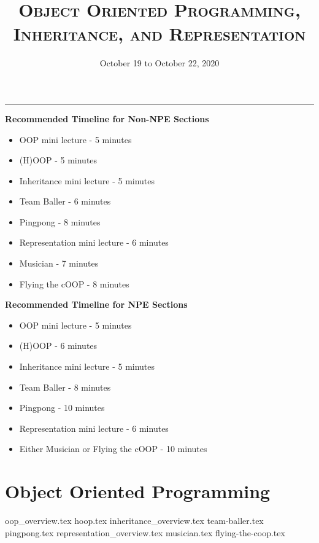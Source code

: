\documentclass{exam}
\title{\textsc{Object Oriented Programming, Inheritance, and Representation}}
\date{October 19 to October 22, 2020}
\begin{document}
\maketitle
\rule{\textwidth}{0.15em}
\fontsize{12}{15}\selectfont

\begin{guide}
\textbf{Recommended Timeline for Non-NPE Sections}
\begin{itemize}
	\item OOP mini lecture - 5 minutes
	\item (H)OOP - 5 minutes
	\item Inheritance mini lecture - 5 minutes
	\item Team Baller - 6 minutes
	\item Pingpong - 8 minutes
	\item Representation mini lecture - 6 minutes
	\item Musician - 7 minutes
	\item Flying the cOOP - 8 minutes
\end{itemize}
\vspace{.5cm}
\textbf{Recommended Timeline for NPE Sections}
\begin{itemize}
	\item OOP mini lecture - 5 minutes
	\item (H)OOP - 6 minutes
	\item Inheritance mini lecture - 5 minutes
	\item Team Baller - 8 minutes
	\item Pingpong - 10 minutes
	\item Representation mini lecture - 6 minutes
	\item Either Musician or Flying the cOOP - 10 minutes
\end{itemize}
\end{guide}
\section{Object Oriented Programming}
\begin{questions}
{oop_overview.tex}
{hoop.tex}
\newpage
{inheritance_overview.tex}
{team-baller.tex}
{pingpong.tex}
\newpage
{representation_overview.tex}
{musician.tex}
{flying-the-coop.tex}
\end{questions}
\end{document}

